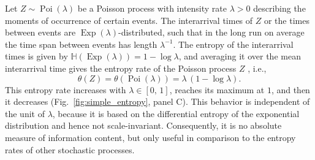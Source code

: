 \documentclass[smallextended]{svjour3}
\renewcommand{\H}{\mathbb{H}}
\newcommand{\Exp}{\operatorname{Exp}}
\newcommand{\Poi}{\operatorname{Poi}}
\newcommand{\ie}{i.e.}
\begin{document}
Let $Z\sim\Poi(\lambda)$ be a Poisson process with intensity rate $\lambda>0$ describing the moments of occurrence of certain events.
The interarrival times of $Z$ or the times between events are $\Exp(\lambda)$-distributed, such that in the long run on average the time span between events has length $\lambda^{-1}$.
The entropy of the interarrival times is given by $\H(\Exp(\lambda))=1-\log \lambda$, and averaging it over the mean interarrival time gives the entropy rate of the Poisson process $Z$ \citep[Section 3.3]{Gaspard1993PR}, \ie,
\begin{equation*}
  \theta(Z) = \theta(\Poi(\lambda)) = \lambda\,(1-\log \lambda).
\end{equation*}
This entropy rate increases with $\lambda\in[0,\,1]$, reaches its maximum at $1$, and then it decreases (Fig.~\ref{fig:simple_entropy}, panel C).
This behavior is independent of the unit of $\lambda$, because it is based on the differential entropy of the exponential distribution and hence not scale-invariant.
Consequently, it is no absolute measure of information content, but only useful in comparison to the entropy rates of other stochastic processes.
\end{document}

